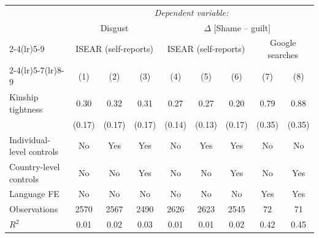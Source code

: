 {\begin{tabular}{l*{8}{c}}\toprule\toprule&\multicolumn{8}{c}{\textit{Dependent variable:}}\\[.1cm] & \multicolumn{3}{c}{Disgust} &\multicolumn{5}{c}{$\Delta$ [Shame -- guilt]}\\\cmidrule(lr){2-4}\cmidrule(lr){5-9} &\multicolumn{3}{c}{ISEAR (self-reports)} &\multicolumn{3}{c}{ISEAR (self-reports)} &\multicolumn{2}{c}{Google searches} \\\cmidrule(lr){2-4}\cmidrule(lr){5-7}\cmidrule(lr){8-9}
                &\multicolumn{1}{c}{(1)}         &\multicolumn{1}{c}{(2)}         &\multicolumn{1}{c}{(3)}         &\multicolumn{1}{c}{(4)}         &\multicolumn{1}{c}{(5)}         &\multicolumn{1}{c}{(6)}         &\multicolumn{1}{c}{(7)}         &\multicolumn{1}{c}{(8)}         \\
\midrule
Kinship tightness $\qquad$&     0.30\sym{*}  &     0.32\sym{*}  &     0.31\sym{*}  &     0.27\sym{*}  &     0.27\sym{**} &     0.20         &     0.79\sym{**} &     0.88\sym{**} \\
                &   (0.17)         &   (0.17)         &   (0.17)         &   (0.14)         &   (0.13)         &   (0.17)         &   (0.35)         &   (0.35)         \\
\addlinespace
Individual-level controls&       No         &      Yes         &      Yes         &       No         &      Yes         &      Yes         &       No         &       No         \\
\addlinespace
Country-level controls&       No         &       No         &      Yes         &       No         &       No         &      Yes         &       No         &      Yes         \\
\addlinespace
Language FE     &       No         &       No         &       No         &       No         &       No         &       No         &      Yes         &      Yes         \\
\midrule
Observations    &     2570         &     2567         &     2490         &     2626         &     2623         &     2545         &       72         &       71         \\
\(R^{2}\)       &     0.01         &     0.02         &     0.03         &     0.01         &     0.01         &     0.02         &     0.42         &     0.45         \\
\bottomrule
\end{tabular}
}
